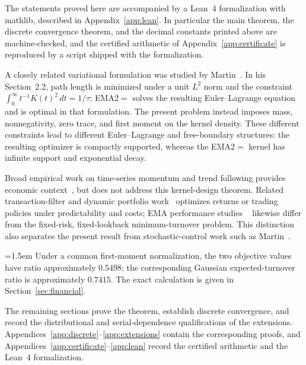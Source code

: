 \documentclass[11pt]{amsart}
\theoremstyle{definition}
\theoremstyle{remark}
\begin{document}
The statements proved here are accompanied by a Lean~4 formalization with
mathlib, described in Appendix~\ref{app:lean}. In particular the main theorem,
the discrete convergence theorem, and the decimal constants printed above are
machine-checked, and the certified arithmetic of
Appendix~\ref{app:certificate} is reproduced by a script shipped with the
formalization.

A closely related variational formulation was studied by Martin~\cite{Martin2021}.
In his Section~2.2, path length is minimized under
a unit $L^2$ norm and the constraint
$\int_0^\infty t^{-1}K(t)^2\,dt=1/\tau$; EMA2$=$ solves the resulting
Euler--Lagrange equation and is optimal in that formulation. The present problem
instead imposes mass, nonnegativity, zero trace, and first moment on the kernel
density. These different constraints lead to different Euler--Lagrange and
free-boundary structures: the resulting optimizer is compactly supported, whereas
the EMA2$=$ kernel has infinite support and exponential decay.

Broad empirical work on time-series momentum and trend following provides
economic context~\cite{MoskowitzOoiPedersen,HurstOoiPedersen}, but does not
address this kernel-design theorem. Related transaction-filter and dynamic
portfolio work~\cite{BalversWu,GarleanuPedersen} optimizes returns or trading
policies under predictability and costs; EMA performance studies
~\cite{GrebenkovSerror,ZakamulinGiner} likewise differ from the fixed-risk,
fixed-lookback minimum-turnover problem. This distinction also separates the
present result from stochastic-control work such as Martin~\cite{Martin2012}.

\begingroup\emergencystretch=1.5em
Under a common first-moment normalization, the two objective values have ratio
approximately $0.5498$; the corresponding Gaussian expected-turnover ratio is
approximately $0.7415$. The exact calculation is given in Section~\ref{sec:financial}.
\par\endgroup

The remaining sections prove the theorem, establish discrete convergence, and
record the distributional and serial-dependence qualifications of the extensions.
Appendices~\ref{app:discrete}--\ref{app:extensions} contain the corresponding
proofs, and Appendices~\ref{app:certificate}--\ref{app:lean} record the certified
arithmetic and the Lean~4 formalization.
\end{document}
